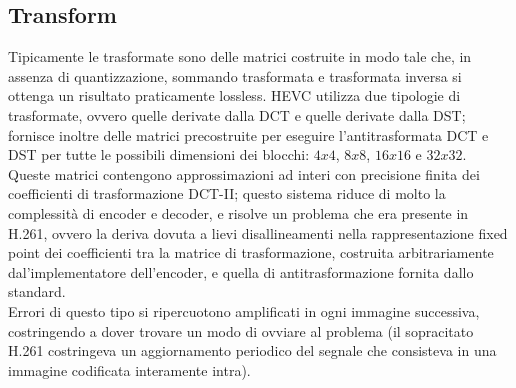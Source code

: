\subsection{Transform}
Tipicamente le trasformate sono delle matrici costruite in modo tale che, in 
assenza di quantizzazione, sommando trasformata e trasformata inversa si 
ottenga un risultato praticamente lossless.
HEVC utilizza due tipologie di trasformate, ovvero quelle derivate dalla DCT e
quelle derivate dalla DST; fornisce inoltre delle matrici precostruite per 
eseguire l'antitrasformata DCT e DST per tutte le possibili dimensioni dei 
blocchi: $4x4$, $8x8$, $16x16$ e $32x32$.
Queste matrici contengono approssimazioni ad interi con precisione finita dei 
coefficienti di trasformazione DCT-II; questo sistema riduce di molto la 
complessità di encoder e decoder, e risolve un problema che era presente in 
H.261, ovvero la deriva dovuta a lievi disallineamenti nella rappresentazione 
fixed point dei coefficienti tra la matrice di trasformazione, costruita 
arbitrariamente dal'implementatore dell'encoder, e quella di antitrasformazione 
fornita dallo standard. \\
Errori di questo tipo si ripercuotono amplificati in ogni immagine successiva, 
costringendo a dover trovare un modo di ovviare al problema (il sopracitato 
H.261 costringeva un aggiornamento periodico del segnale che consisteva in una 
immagine codificata interamente intra).


